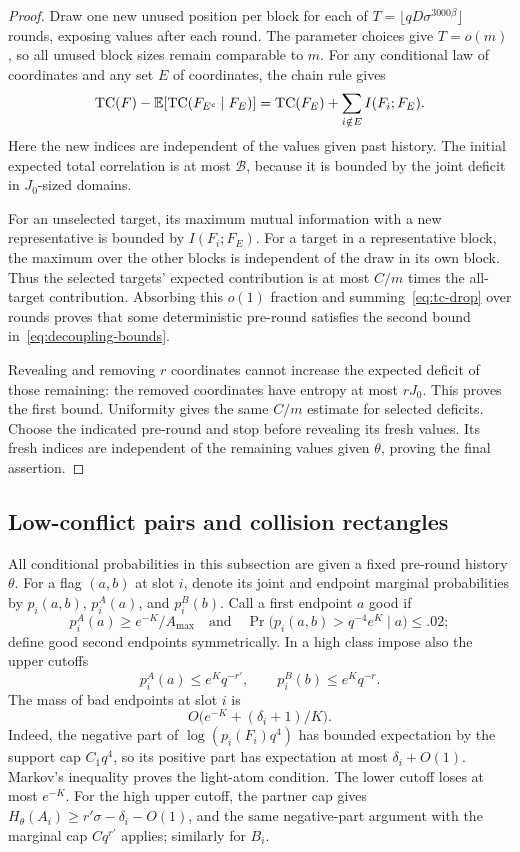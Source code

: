 \begin{proof}
Draw one new unused position per block for each of
$T=\lfloor qD\sigma^{3000\beta}\rfloor$ rounds, exposing values after
each round.  The parameter choices give $T=o(m)$, so all unused block
sizes remain comparable to $m$.
For any conditional law of coordinates and any set $E$ of coordinates,
the chain rule gives
\begin{equation}\label{eq:tc-drop}
 \operatorname{TC}(F)-\mathbb E[\operatorname{TC}(F_{E^c}\mid F_E)]
 =\operatorname{TC}(F_E)+\sum_{i\notin E}I(F_i;F_E).
\end{equation}
Here the new indices are independent of the values given past history.
The initial expected total correlation is at most $\mathcal B$, because
it is bounded by the joint deficit in $J_0$-sized domains.

For an unselected target, its maximum mutual information with a new
representative is bounded by $I(F_i;F_E)$.  For a target in a
representative block, the maximum over the other blocks is independent
of the draw in its own block.  Thus the selected targets' expected
contribution is at most $C/m$ times the all-target contribution.
Absorbing this $o(1)$ fraction and summing~\eqref{eq:tc-drop} over rounds
proves that some deterministic pre-round satisfies the second bound
in~\eqref{eq:decoupling-bounds}.

Revealing and removing $r$ coordinates cannot increase the expected
deficit of those remaining: the removed coordinates have entropy at
most $rJ_0$.  This proves the first bound.  Uniformity gives the same
$C/m$ estimate for selected deficits.  Choose the indicated pre-round
and stop before revealing its fresh values.  Its fresh indices are
independent of the remaining values given $\theta$, proving the final
assertion.
\end{proof}

\subsection{Low-conflict pairs and collision rectangles}

All conditional probabilities in this subsection are given a fixed
pre-round history $\theta$.  For a flag $(a,b)$ at slot $i$, denote its
joint and endpoint marginal probabilities by $p_i(a,b)$, $p_i^A(a)$,
and $p_i^B(b)$.  Call a first endpoint $a$ good if
\[
 p_i^A(a)\ge e^{-K}/A_{\max}\quad\text{and}\quad
 \Pr\bigl(p_i(a,b)>q^{-4}e^K\mid a\bigr)\le .02;
\]
define good second endpoints symmetrically.  In a high class impose
also the upper cutoffs
\[
 p_i^A(a)\le e^Kq^{-r'},\qquad p_i^B(b)\le e^Kq^{-r}.
\]
The mass of bad endpoints at slot $i$ is
\begin{equation}\label{eq:bad-endpoint-mass}
 O\bigl(e^{-K}+(\delta_i+1)/K\bigr).
\end{equation}
Indeed, the negative part of $\log(p_i(F_i)q^4)$ has bounded expectation
by the support cap $C_1q^4$, so its positive part has expectation at most
$\delta_i+O(1)$.  Markov's inequality proves the light-atom condition.
The lower cutoff loses at most $e^{-K}$.  For the high upper cutoff,
the partner cap gives
$H_\theta(A_i)\ge r'\sigma-\delta_i-O(1)$, and the same negative-part
argument with the marginal cap $Cq^{r'}$ applies; similarly for $B_i$.

